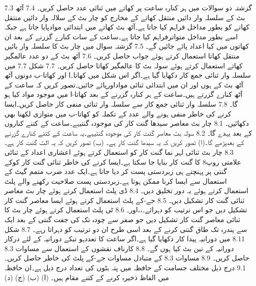 7.3	گزشتہ دو سوالات میں ہر کنارہ ساعت پر کھاتے میں ثنائی عدد حاصل کریں۔
7.4	آٹھ بٹ کے سلسلہ وار دائیں منتقل کھاتے کے مخارج کو چار بٹ کے سلالہ وار دائیں منتقل کھاتے کو بطور مداخل فراہم کیا جاتا ہے۔آٹھ بٹ کھاتے میں ابتدائی موادپایا جاتا ہے جبکہ اسے بطور مداخل متواترفراہم کیا جاتا ہے۔ساعت کے سات کنارے گزرنے کے بعد ان کھاتوں میں کیا اعداد پائے جائیں گے۔
7.5	گزشتہ سوال میں چار بٹ کا سلسلہ وار بائیں منتقل کھاتا استعمال کرتے 	ہوئے جواب حاصل کریں۔
7.6	آٹھ بٹ کے دو عدد عالمگیر کھاتے استعمال کرتے ہوئے سولہ بٹ کا عالمگیر کھاتا حاصل کریں۔
7.7	شکل 7.7 میں سلسلہ وار ثنائی جمع کار دکھایا گیا ہے۔اگر اس شکل میں کھاتا۔ا اور کھاتا-ب دونوں آٹھ آٹھ بٹ کے ہوں اور ان میں ابتدائی ثنائی مواداورپائے جائیں۔تصور کریں کہ ساعت کے آٹھ کنارے گزرتے ہیں۔ساعت کے ہر کنارہ گزرنے کے بعد کھاتا-ا  میں موجود مواد کیا ہو گا۔
7.8	سلسلہ وار ثنائی جمع کار سے سلسلہ وار ثنائی منفی کار حاصل کریں۔ایسا کرنے کی خاطر منفی ہونے والے عدد کے تکملہ کو کھاتا-ب میں متوازی لکھنا بھی دکھائیں۔
8.1	چار بٹ معاصر سیدھا گنت کار کی موجودہ گنتیہے۔ساعت کے کتنے کناروں کے بعد یہدے گا۔
8.2	سولہ بٹ معاصر گنت کار کی موجودہ گنتیہے۔یہ ساعت کے کتنے کنارے گزرنے کے بعدپڑھے گا۔(ا) تصور کریں کہ یہ سیدھا گنت کار ہے۔ (ب) تصور کریں کہ یہ الٹ گنت کار ہے۔
8.3	چار بٹ ثنائی لہر نما گنت کار کو استعمال کرتے ہوئے اعشاری اعداد کے ثنائی علامتی روپ8 کا گنت کار بنایا جا سکتا ہے۔ایسا کرنے کی خاطر ثنائی گنت کار کوکے گنتی پر پہنچتے ہی زبردستی پست کر دیا جاتا ہے۔ایک عدد ضرب متمم گیٹ کے استعمال سے ایسا کرنا ممکن ہوتا ہے۔زبردستی پست صلاحیت رکھنے والے پلٹ استعمال کرتے ہوئے یہ دور تخلیق دیں۔ 
8.4	ڈی پلٹ استعمال کرتے ہوئے چار بٹ معاصر ثنائی گنت کار تشکیل دیں۔ 
8.5	جے-کے پلٹ استعمال کرتے ہوئے ایسا معاصر گنت کار تشکیل دیں جو اس ترتیب کو دہرائے۔،،اور۔
8.6	ٹی پلٹ استعمال کرتے ہوئے چار بٹ کا ثنائی معاصر گنت کار تشکیل دیں جو صفر سے چودہ تک کی جفت گنتی کے بعد ایک سے پندرہ تک طاق گنتی کرنے کے بعد اسی طرح ان دو ترتیب کو دہراتا رہے۔
8.7	شکل 8.11 میں دورانیہ پیدا کار دکھایا گیا ہے۔اگر ساعت کا تعددہو تبکے دورانیہ کے لئے درکار دورانیہ کے تین بٹ کیا ہوں گے۔
8.8	کارناف نقشوں کے استعمال سے مساوات 8.3 حاصل کریں۔
8.9	مساوات 8.3 کے متبادل مساوات جے-کے پلٹ کی خاطر حاصل کریں۔ 
9.1	درج ذیل مختلف جسامت کے حافظہ میں پتہ بٹوں کی تعداد درج ذیل ہے۔ان حافظہ میں الفاظ ذخیرہ کرنے کے کتنے مقام ہیں۔ (ا) (ب) (ج) (د)
